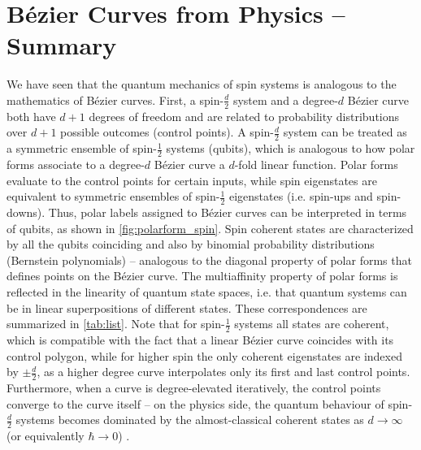 \documentclass[final,3p,mathptmx]{elsarticle}
\begin{document}
\section{B\'{e}zier Curves from Physics -- Summary}\label{sec:summary}
We have seen that the quantum mechanics of spin systems is analogous to the mathematics of B\'{e}zier curves. First, a spin-$\frac{d}{2}$ system and a degree-$d$ B\'{e}zier curve both have $d+1$ degrees of freedom and are related to probability distributions over $d+1$ possible outcomes (control points). A spin-$\frac{d}{2}$ system can be treated as a symmetric ensemble of spin-$\frac{1}{2}$ systems (qubits), which is analogous to how polar forms associate to a degree-$d$ B\'{e}zier curve a $d$-fold linear function. Polar forms evaluate to the control points for certain inputs, while spin eigenstates are equivalent to symmetric ensembles of spin-$\frac{1}{2}$ eigenstates (i.e. spin-ups and spin-downs). Thus, polar labels assigned to B\'{e}zier curves can be interpreted in terms of qubits, as shown in \autoref{fig:polarform_spin}. Spin coherent states are characterized by all the qubits coinciding and also by binomial probability distributions (Bernstein polynomials) -- analogous to the diagonal property of polar forms that defines points on the B\'{e}zier curve. The multiaffinity property of polar forms is reflected in the linearity of quantum state spaces, i.e. that quantum systems can be in linear superpositions of different states. These correspondences are summarized in \autoref{tab:list}. Note that for spin-$\frac{1}{2}$ systems all states are coherent, which is compatible with the fact that a linear B\'{e}zier curve coincides with its control polygon, while for higher spin the only coherent eigenstates are indexed by $\pm\frac{d}{2}$, as a higher degree curve interpolates only its first and last control points. Furthermore, when a curve is degree-elevated iteratively, the control points converge to the curve itself -- on the physics side,  the quantum behaviour of spin-$\frac{d}{2}$ systems becomes dominated by the almost-classical coherent states as $d \rightarrow \infty$ (or equivalently $\hbar \rightarrow 0$) \cite[Ch. 7.5]{gazeau2009coherent}.
\end{document}
